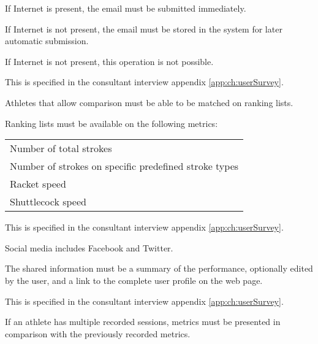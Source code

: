If Internet is present, the email must be submitted immediately.

If Internet is not present, the email must be stored in the system for later automatic submission.


If Internet is not present, this operation is not possible.


This  is specified in the consultant interview appendix \ref{app:ch:userSurvey}.

Athletes that allow comparison must be able to be matched on ranking lists.

Ranking lists must be available on the following metrics: \newline
\begin{tabularx}{\textwidth}{X}
    Number of total strokes \\
    Number of strokes on specific predefined stroke types \\
    Racket speed \\
    Shuttlecock speed \\
\end{tabularx}


This  is specified in the consultant interview appendix \ref{app:ch:userSurvey}.

Social media includes Facebook and Twitter.

The shared information must be a summary of the performance, optionally edited by the user, and a link to the complete user profile on the web page.


This  is specified in the consultant interview appendix \ref{app:ch:userSurvey}.

If an athlete has multiple recorded sessions, metrics must be presented in comparison with the previously recorded metrics.

